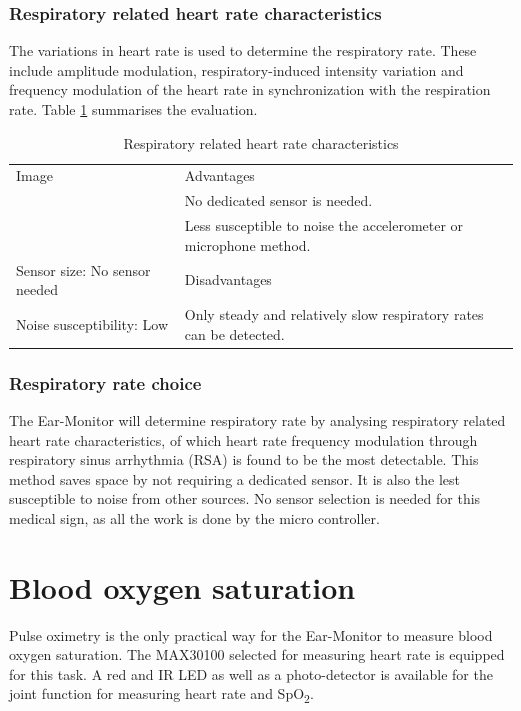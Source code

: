 \subsubsection{Respiratory related heart rate characteristics}
The variations in heart rate is used to determine the respiratory rate. These include amplitude modulation, respiratory-induced intensity variation and frequency modulation of the heart rate in synchronization with the respiration rate. Table \ref{tab:EarRRHRC_Eval} summarises the evaluation.

\begin{table}[H]
\caption{Respiratory related heart rate characteristics}
\label{tab:EarRRHRC_Eval}
\renewcommand{\arraystretch}{1.3}	%
\centering
\begin{tabular}{|p{5cm}|p{8cm}|} 
 \hline
 Image 		& 	Advantages  \\ 
  			&	\tabitem No dedicated sensor is needed.\\
  			&	\tabitem Less susceptible to noise the accelerometer or microphone method.\\
\hline
Sensor size: No sensor needed		&	Disadvantages  \\ 
Noise susceptibility: Low			&	\tabitem Only steady and relatively slow respiratory rates can be detected.\\
 \hline
\end{tabular}
\end{table}

\subsubsection{Respiratory rate choice}
The Ear-Monitor will determine respiratory rate by analysing respiratory related heart rate characteristics, of which heart rate frequency modulation through respiratory sinus arrhythmia (RSA) is found to be the most detectable. This method saves space by not requiring a dedicated sensor. It is also the lest susceptible to noise from other sources. No sensor selection is needed for this medical sign, as all the work is done by the micro controller.

\section{Blood oxygen saturation}
Pulse oximetry is the only practical way for the Ear-Monitor to measure blood oxygen saturation. The MAX30100 selected for measuring heart rate is equipped for this task. A red and IR LED as well as a photo-detector is available for the joint function for measuring heart rate and SpO\textsubscript{2}.


